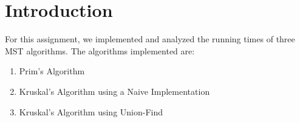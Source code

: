 \section{Introduction}
For this assignment, we implemented and analyzed the running times of three MST algorithms. The algorithms implemented are:
\begin{enumerate}
	\item Prim's Algorithm
	\item Kruskal's Algorithm using a Naive Implementation
	\item Kruskal's Algorithm using Union-Find
\end{enumerate}

\pagebreak
